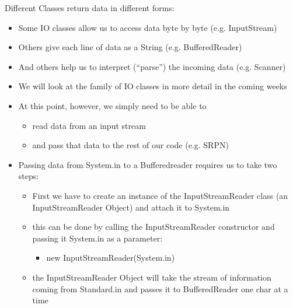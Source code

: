 \documentclass{beamer}
\begin{document}
\begin{frame}
Different Classes return data in different forms:
\begin{itemize}
\item Some IO classes allow us to access data byte by byte (e.g. InputStream)
\item Others give each line of data as a String (e.g. BufferedReader)
\item And others help us to interpret (``parse'') the incoming data (e.g. Scanner)
\end{itemize}
\end{frame}


\begin{frame}
\begin{itemize}
\item We will look at the family of IO classes in more detail in the coming weeks
\item At this point, however, we simply need to be able to
\begin{itemize}
\item read data from an input stream
\item and pass that data to the rest of our code (e.g. SRPN)
\end{itemize}
\end{itemize}
\end{frame}

\begin{frame}
\begin{itemize}
\item Passing data from System.in to a Bufferedreader requires us to take two steps:
\begin{itemize}
\item First we have to create an instance of the InputStreamReader class (an InputStreamReader Object) and attach it to System.in
\item this can be done by calling the InputStreamReader constructor and passing it System.in as a parameter:

\begin{itemize}
\item new InputStreamReader(System.in)
\end{itemize}


\item the InputStreamReader Object will take the stream of information coming from Standard.in and passes it to BufferedReader one char at a time

\end{itemize}
\end{itemize}

\end{frame}
\end{document}
